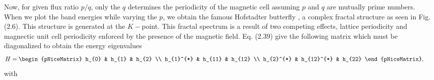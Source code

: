 \documentclass{report}
\begin{document}
Now, for given flux ratio $p/q$, only the $q$ determines the periodicity of the magnetic cell assuming $p$ and $q$ are mutually prime numbers. When we plot the band energies while varying the $p$, we obtain the famous Hofstadter butterfly \cite{PhysRevB.14.2239}, a complex fractal structure as seen in Fig.(2.6). This structure is generated at the $K-$point. This fractal spectrum is a result of two competing effects, lattice periodicity and magnectic unit cell periodicity enforced by the presence of the magnetic field. Eq. (2.39) give the following matrix which must be diagonalized to obtain the energy eigenvalues
\begin{equation}
	\renewcommand{\arraystretch}{0.85}
	\begin{aligned}
		H
		 & =
		\begin{pNiceMatrix}
			h_{0}     & h_{1}      & h_{2}  \\
			h_{1}^{*} & h_{11}     & h_{12} \\
			h_{2}^{*} & h_{12}^{*} & h_{22}
		\end{pNiceMatrix},
	\end{aligned}
\end{equation}
with
\end{document}
